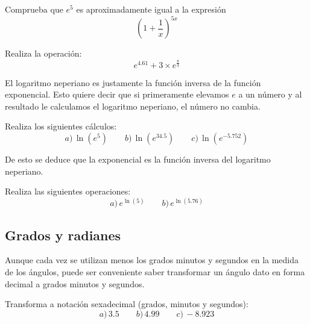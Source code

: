 \documentclass[12pt]{article}
\newenvironment{capitulo}{\begin{tcolorbox}[colback=blue!5!white,colframe=red!75!black]}{\end{tcolorbox}\bigskip}
\newenvironment{ejer}{\begin{tcolorbox}[center title, 
fonttitle=\sffamily\bfseries,colback=blue!5,colframe=orange]}{\end{tcolorbox}}
\begin{document}
\begin{ejer}

Comprueba que $e^5$ es aproximadamente igual a la expresión
\[
\left(1+\frac{1}{x}\right)^{5x}
\]

\end{ejer}

\begin{ejer}

Realiza la operación:
\[
e^{4.61}+3\times e^{\frac{8}{3}}
\]

\end{ejer}



El logaritmo neperiano es justamente la función inversa de la función exponencial. Esto quiere decir que si primeramente elevamos $e$ a un número y al resultado le calculamos el logaritmo neperiano, el número no cambia.

\begin{ejer}

Realiza los siguientes cálculos:
\[
a)\, \ln\left(e^5\right) \qquad b)\, \ln\left(e^{34.5}\right) \qquad c)\, \ln\left(e^{-5.752}\right)
\]

\end{ejer}

De esto se deduce que la exponencial es la función inversa del logaritmo neperiano.

\begin{ejer}

Realiza las siguientes operaciones:
\[
a)\, e^{\ln(5)}\qquad b)\, e^{\ln(5.76)}
\]

\end{ejer}




\newpage

\begin{capitulo}
\section*{Grados y radianes}
\end{capitulo}



Aunque cada vez se utilizan menos los grados minutos y segundos en la medida de los ángulos, puede ser conveniente saber transformar un ángulo dato en forma decimal a grados minutos y segundos.


\begin{ejer}

Transforma a notación sexadecimal (grados, minutos y segundos):
\[
a)\, 3.5 \qquad  b)\, 4.99 \qquad c) \, -8.923
\]
\end{ejer}
\end{document}
